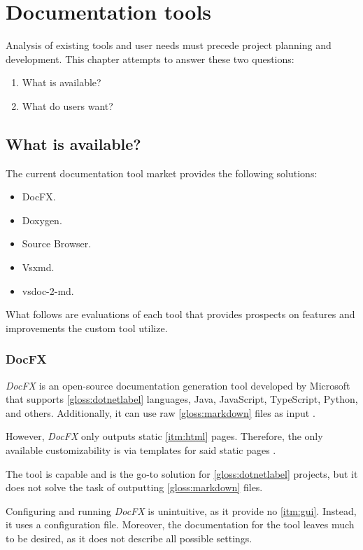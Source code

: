 \chapter{Documentation tools}

Analysis of existing tools and user needs must precede project planning and development. This chapter attempts to answer these two questions:
\begin{enumerate}
    \item What is available?
    \item What do users want?
\end{enumerate}

\section{What is available?} \label{sec:whatisavailable}
The current documentation tool market provides the following solutions:

\begin{itemize}
    \item DocFX.
    \item Doxygen.
    \item Source Browser.
    \item Vsxmd.
    \item vsdoc-2-md.
\end{itemize}

What follows are evaluations of each tool that provides prospects on features and improvements the custom tool utilize.

\subsection{DocFX} \label{ssec:docfx}

\textit{DocFX} is an open-source documentation generation tool developed by Microsoft that supports \ref{gloss:dotnetlabel} languages, Java, JavaScript, TypeScript, Python, and others. Additionally, it can use raw \ref{gloss:markdown} files as input \cite{wei_docfx_2020}.

However, \textit{DocFX} only outputs static \ref{itm:html} pages. Therefore, the only available customizability is via templates for said static pages \cite{wei_docfx_2020}.

The tool is capable and is the go-to solution for \ref{gloss:dotnetlabel} projects, but it does not solve the task of outputting \ref{gloss:markdown} files.

Configuring and running \textit{DocFX} is unintuitive, as it provide no \ref{itm:gui}. Instead, it uses a configuration file. Moreover, the documentation for the tool leaves much to be desired, as it does not describe all possible settings.

